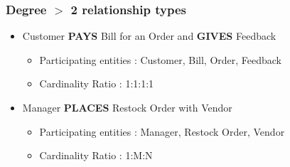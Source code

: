     \subsubsection{Degree $>$ 2 relationship types}
        \begin{itemize}
            \item Customer \textbf{PAYS} Bill for an Order and \textbf{GIVES} Feedback
                \begin{itemize}[label=-]
                    \item Participating entities : Customer, Bill, Order, Feedback
                    \item Cardinality Ratio : 1:1:1:1
                \end{itemize}

            \item Manager \textbf{PLACES} Restock Order with Vendor
                \begin{itemize}[label=-]
                    \item Participating entities : Manager, Restock Order, Vendor
                    \item Cardinality Ratio : 1:M:N
                \end{itemize}
        \end{itemize}
